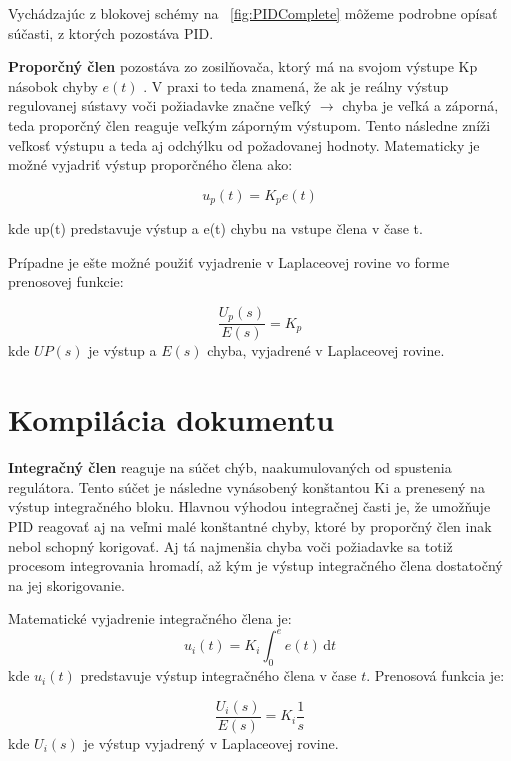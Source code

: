 Vychádzajúc z blokovej schémy na \figurename~\ref{fig:PIDComplete} môžeme podrobne opísať súčasti, z ktorých pozostáva PID.

\textbf {Proporčný člen} pozostáva zo zosilňovača, ktorý má na svojom výstupe Kp násobok chyby $e(t)$ . V praxi to teda znamená, že ak je reálny výstup regulovanej sústavy voči požiadavke značne veľký $\rightarrow$ chyba je veľká a záporná, teda proporčný člen reaguje veľkým záporným výstupom. Tento následne zníži veľkosť výstupu a teda aj odchýlku od požadovanej hodnoty. Matematicky je možné vyjadriť výstup proporčného člena ako:

\begin{equation}
u_p (t)= K_p e( t )
\end{equation}

kde up(t) predstavuje výstup a e(t) chybu na vstupe člena v čase t. 

Prípadne je ešte možné použiť vyjadrenie v Laplaceovej rovine vo forme prenosovej funkcie:

\begin{equation}
\dfrac {U_p(s)} {E(s)} = K_p 
\end{equation}
kde $UP(s)$ je výstup a $E(s)$ chyba, vyjadrené v Laplaceovej rovine.
\section{Kompilácia dokumentu}

\textbf{Integračný člen} reaguje na súčet chýb, naakumulovaných od spustenia regulátora. Tento súčet je následne vynásobený konštantou Ki a prenesený na výstup integračného bloku. Hlavnou výhodou integračnej časti je, že umožňuje PID reagovať aj na veľmi malé konštantné chyby, ktoré by proporčný člen inak nebol schopný korigovať. Aj tá najmenšia chyba voči požiadavke sa totiž procesom integrovania hromadí, až kým je výstup integračného člena dostatočný na jej skorigovanie. 

Matematické vyjadrenie integračného člena je:
\begin{equation}
u_i (t)= K_i \int_0^e \! e( t ) \, \mathrm{d}t 
\end{equation}
kde $u_i(t)$ predstavuje výstup integračného člena v čase $t$. 
Prenosová funkcia je:

\begin{equation}
\dfrac{U_i(s)}{E(s)}  = K_i\dfrac{ 1}{s} 
\end{equation}
kde $U_i (s)$ je výstup vyjadrený v Laplaceovej rovine.




